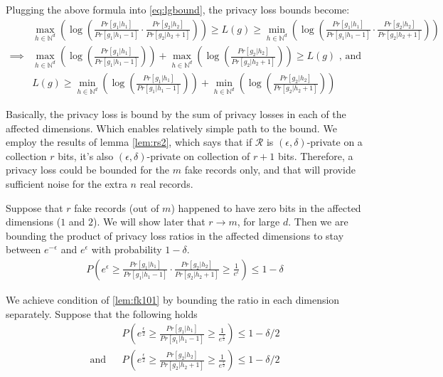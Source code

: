 \documentclass[11pt]{article}
\newcommand{\cR}{\mathcal{R}}
\newcommand{\N}{\mathbb{N}}
\begin{document}
Plugging the above formula into \eqref{eq:lgbound}, the privacy loss bounds become:
\begin{align*}
& \max_{h \in \N^d}  \left ( \log \left (   \frac{  Pr[ g_1 | h_1]  } {  Pr[ g_1 | h_1 - 1]  } \cdot \frac{  Pr[ g_2 | h_2]  } {  Pr[ g_2 | h_2 + 1]  }  \right ) \right ) \ge L(g) \ge  \min_{h \in \N^d}  \left ( \log \left (  \frac{  Pr[ g_1 | h_1]  } {  Pr[ g_1 | h_1 - 1]  } \cdot \frac{  Pr[ g_2 | h_2]  } {  Pr[ g_2 | h_2 + 1]  }   \right ) \right ) \\
\implies &  \max_{h \in \N^d}  \left ( \log \left (   \frac{  Pr[ g_1 | h_1]  } {  Pr[ g_1 | h_1 - 1]  } \right ) \right )  + \max_{h \in \N^d}  \left ( \log  \left (\frac{  Pr[ g_2 | h_2]  } {  Pr[ g_2 | h_2 + 1]  }  \right) \right) \ge L(g) \text{ , and } \\
&  L(g) \ge \min_{h \in \N^d}  \left ( \log \left (   \frac{  Pr[ g_1 | h_1]  } {  Pr[ g_1 | h_1 - 1]  } \right ) \right )  + \min_{h \in \N^d}  \left ( \log  \left (\frac{  Pr[ g_2 | h_2]  } {  Pr[ g_2 | h_2 + 1]  }  \right) \right)
\end{align*}

Basically, the privacy loss is bound by the sum of privacy losses in each of the affected dimensions.  Which enables relatively simple path to the bound.   We employ the results of lemma \eqref{lem:rs2}, which says that if $\cR$ is $(\epsilon, \delta)$-private on a collection $r$ bits, it's also $(\epsilon, \delta)$-private on collection of $r+1$ bits.  Therefore, a privacy loss could be bounded for the $m$ fake records only, and that will provide sufficient noise for the extra $n$ real records.  

Suppose that $r$ fake records (out of $m$) happened to have zero bits in the affected dimensions ($1$ and $2$).  We will show later that $r \to m$,  for  large $d$.  Then we are bounding the product of privacy loss ratios in the affected dimensions to stay between $e^{-\epsilon}$ and $e^\epsilon$ with probability $1-\delta$.
\begin{align} \label{lem:fk101}
P \left (   e^\epsilon \ge \frac{  Pr[ g_1 | h_1]  } {  Pr[ g_1 | h_1 - 1]  } \cdot \frac{  Pr[ g_2 | h_2]  } {  Pr[ g_2 | h_2 + 1]  }  \ge \frac{1}{e^\epsilon} \right ) \le 1 - \delta
\end{align}

We achieve condition of \eqref{lem:fk101} by bounding the ratio in each dimension separately.  Suppose that the following holds
\begin{align*} \label{lem:fk101}
&& P \left (   e^\frac{\epsilon}{2} \ge \frac{  Pr[ g_1 | h_1]  } {  Pr[ g_1 | h_1 - 1] }  \ge \frac{1}{e^\frac{\epsilon}{2}} \right ) \le 1 - \delta/2 \\
\text{and} && P \left (   e^\frac{\epsilon}{2} \ge \frac{  Pr[ g_2 | h_2]  } {  Pr[ g_2 | h_2 + 1]  }  \ge \frac{1}{e^\frac{\epsilon}{2}} \right ) \le 1 - \delta/2 
\end{align*}
\end{document}
